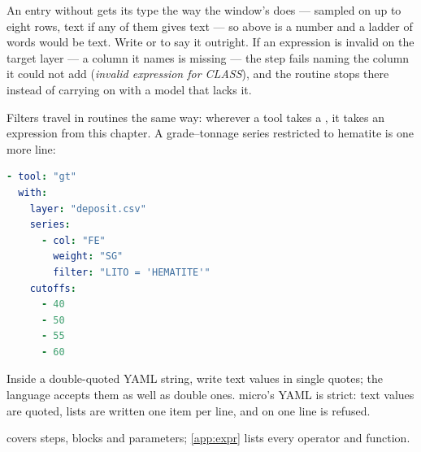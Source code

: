 An entry without  gets its type the way the window's  does — sampled on up to eight rows, text if any of them gives text — so  above is a number and a ladder of words would be text. Write  or  to say it outright. If an expression is invalid on the target layer — a column it names is missing — the step fails naming the column it could not add (\emph{invalid expression for CLASS}), and the routine stops there instead of carrying on with a model that lacks it.

Filters travel in routines the same way: wherever a tool takes a , it takes an expression from this chapter. A grade–tonnage series restricted to hematite is one more line:

\begin{lstlisting}[language=yaml]
- tool: "gt"
  with:
    layer: "deposit.csv"
    series:
      - col: "FE"
        weight: "SG"
        filter: "LITO = 'HEMATITE'"
    cutoffs:
      - 40
      - 50
      - 55
      - 60
\end{lstlisting}

Inside a double-quoted YAML string, write text values in single quotes; the language accepts them as well as double ones. micro's YAML is strict: text values are quoted, lists are written one item per line, and \code{[40, 50]} on one line is refused.

 covers steps,  blocks and parameters; \cref{app:expr} lists every operator and function.
